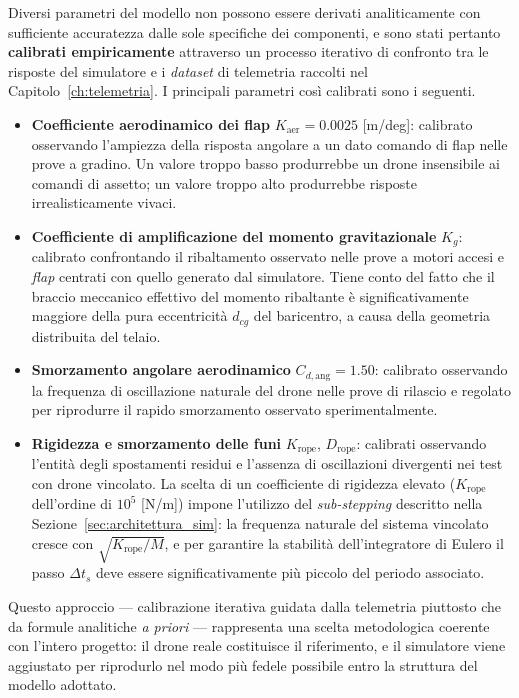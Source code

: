 \documentclass[11pt]{report}
\begin{document}
	Diversi parametri del modello non possono essere derivati analiticamente con sufficiente accuratezza dalle sole specifiche dei componenti, e sono stati pertanto \textbf{calibrati empiricamente} attraverso un processo iterativo di confronto tra le risposte del simulatore e i \textit{dataset} di telemetria raccolti nel Capitolo~\ref{ch:telemetria}. I principali parametri così calibrati sono i seguenti.
	\begin{itemize}
		\item \textbf{Coefficiente aerodinamico dei flap} $K_\text{aer} = 0.0025$ [m/deg]: calibrato osservando l'ampiezza della risposta angolare a un dato comando di flap nelle prove a gradino. Un valore troppo basso produrrebbe un drone insensibile ai comandi di assetto; un valore troppo alto produrrebbe risposte irrealisticamente vivaci.
		\item \textbf{Coefficiente di amplificazione del momento gravitazionale} $K_g$: calibrato confrontando il ribaltamento osservato nelle prove a motori accesi e \textit{flap} centrati con quello generato dal simulatore. Tiene conto del fatto che il braccio meccanico effettivo del momento ribaltante è significativamente maggiore della pura eccentricità $d_{cg}$ del baricentro, a causa della geometria distribuita del telaio.
		\item \textbf{Smorzamento angolare aerodinamico} $C_{d,\text{ang}} = 1.50$: calibrato osservando la frequenza di oscillazione naturale del drone nelle prove di rilascio e regolato per riprodurre il rapido smorzamento osservato sperimentalmente.
		\item \textbf{Rigidezza e smorzamento delle funi} $K_\text{rope}$, $D_\text{rope}$: calibrati osservando l'entità degli spostamenti residui e l'assenza di oscillazioni divergenti nei test con drone vincolato. La scelta di un coefficiente di rigidezza elevato ($K_\text{rope}$ dell'ordine di $10^5$ [N/m]) impone l'utilizzo del \textit{sub-stepping} descritto nella Sezione~\ref{sec:architettura_sim}: la frequenza naturale del sistema vincolato cresce con $\sqrt{K_\text{rope}/M}$, e per garantire la stabilità dell'integratore di Eulero il passo $\Delta t_s$ deve essere significativamente più piccolo del periodo associato.
	\end{itemize}
	
	Questo approccio --- calibrazione iterativa guidata dalla telemetria piuttosto che da formule analitiche \textit{a priori} --- rappresenta una scelta metodologica coerente con l'intero progetto: il drone reale costituisce il riferimento, e il simulatore viene aggiustato per riprodurlo nel modo più fedele possibile entro la struttura del modello adottato.
	
\end{document}
